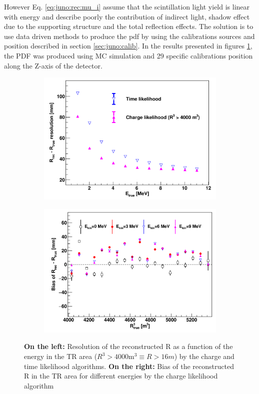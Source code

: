 \documentclass[../main.tex]{subfiles}
\begin{document}
However Eq. \ref{eq:juno:rec:mu_i} assume that the scintillation light yield is linear with energy and describe poorly the contribution of indirect light, shadow effect due to the supporting structure and the total reflection effects. The solution is to use data driven methods to produce the pdf by using the calibrations sources and position described in section \ref{sec:juno:calib}. In the results presented in figures \ref{fig:juno:rec:time_charge_results}, the PDF was produced using MC simulation and 29 specific calibrations position \cite{li_event_2021} along the Z-axis of the detector.
\begin{figure}[ht]
  \centering
  \begin{subfigure}[b]{0.48\linewidth}
    \centering
    \includegraphics[width=\textwidth]{images/juno/reco/charge_likelihood_res.png}
  \end{subfigure}
  \hfill
  \begin{subfigure}[b]{0.48\linewidth}
    \centering
    \includegraphics[width=\textwidth]{images/juno/reco/charge_likelihood_bias.png}
  \end{subfigure}
  \caption{\textbf{On the left:} Resolution of the reconstructed R as a function of the energy in the TR area ($R^3 > 4000 \mathrm{m}^3 \equiv R > 16 m$) by the charge and time likelihood algorithms. \textbf{On the right:} Bias of the reconstructed R in the TR area for different energies by the charge likelihood algorithm}
  \label{fig:juno:rec:time_charge_results}
\end{figure}
\end{document}
